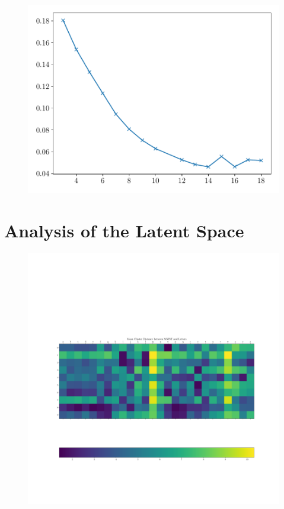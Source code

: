\begin{figure}[htpb]
    \centering
    \includegraphics[width=0.8\linewidth]{figures/samples/emnist_aa_mse_na.pdf}
    \caption{}%
    \label{fig:emnist_aa_mse}
\end{figure}


\section{Analysis of the Latent Space}%
\label{sec:analysis_of_the_latent_space}

\begin{figure}[htpb]
    \centering
    \includegraphics[width=0.8\linewidth]{figures/samples/emnist_distance_matrix_letters.pdf}
    \caption{}%
    \label{fig:}
\end{figure}

